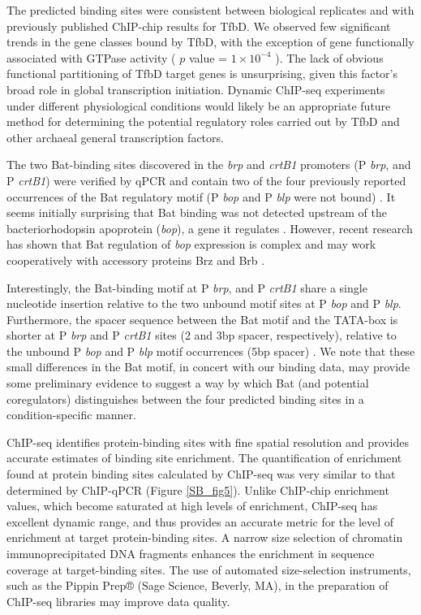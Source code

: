 The predicted binding sites were consistent between biological replicates and with previously published ChIP-chip results for TfbD. We observed few significant trends in the gene classes bound by TfbD, with the exception of gene functionally associated with GTPase activity ( $p$ value = $1\times 10^{−4}$ ). The lack of obvious functional partitioning of TfbD target genes is unsurprising, given this factor's broad role in global transcription initiation. Dynamic ChIP-seq experiments under different physiological conditions would likely be an appropriate future method for determining the potential regulatory roles carried out by TfbD and other archaeal general transcription factors.

The two Bat-binding sites discovered in the {\em brp} and {\em crtB1} promoters (P {\em brp}, and P {\em crtB1}) were verified by qPCR and contain two of the four previously reported occurrences of the Bat regulatory motif (P {\em bop} and P {\em blp} were not bound) \cite{baliga_genomic_2001}. It seems initially surprising that Bat binding was not detected upstream of the bacteriorhodopsin apoprotein ({\em bop}), a gene it regulates \cite{baliga_genomic_2001,gropp1994bat,leong1988characterization,baliga_coordinate_2002}. However, recent research has shown that Bat regulation of {\em bop} expression is complex and may work cooperatively with accessory proteins Brz and Brb \cite{tarasov2008small,tarasov2011small}.

Interestingly, the Bat-binding motif at P {\em brp}, and P {\em crtB1} share a single nucleotide insertion relative to the two unbound motif sites at P {\em bop} and P {\em blp}. Furthermore, the spacer sequence between the Bat motif and the TATA-box is shorter at P {\em brp} and P {\em crtB1} sites (2 and 3bp spacer, respectively), relative to the unbound P {\em bop} and P {\em blp} motif occurrences (5bp spacer) \cite{baliga_genomic_2001}. We note that these small differences in the Bat motif, in concert with our binding data, may provide some preliminary evidence to suggest a way by which Bat (and potential coregulators) distinguishes between the four predicted binding sites in a condition-specific manner.

ChIP-seq identifies protein-binding sites with fine spatial resolution and provides accurate estimates of binding site enrichment. The quantification of enrichment found at protein binding sites calculated by ChIP-seq was very similar to that determined by ChIP-qPCR (Figure \ref{SB_fig5}). Unlike ChIP-chip enrichment values, which become saturated at high levels of enrichment, ChIP-seq has excellent dynamic range, and thus provides an accurate metric for the level of enrichment at target protein-binding sites. A narrow size selection of chromatin immunoprecipitated DNA fragments enhances the enrichment in sequence coverage at target-binding sites. The use of automated size-selection instruments, such as the Pippin Prep® (Sage Science, Beverly, MA), in the preparation of ChIP-seq libraries may improve data quality.


